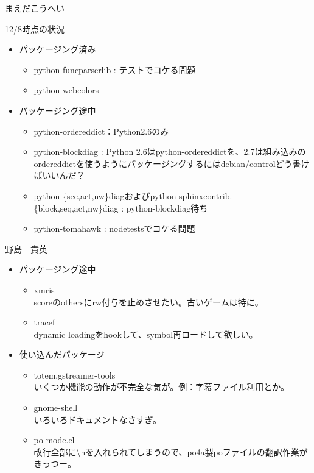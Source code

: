 \begin{prework}{ まえだこうへい }

12/8時点の状況

\begin{itemize}
\item パッケージング済み
\begin{itemize}
\item python-funcparserlib : テストでコケる問題
\item python-webcolors
\end{itemize}
\item パッケージング途中
\begin{itemize}
\item python-ordereddict：Python2.6のみ
\item python-blockdiag : Python 2.6はpython-ordereddictを、2.7は組み込みのordereddictを使うようにパッケージングするにはdebian/controlどう書けばいいんだ？
\item python-\{sec,act,nw\}diagおよびpython-sphinxcontrib.\{block,seq,act,nw\}diag : python-blockdiag待ち
\item python-tomahawk : nodetestsでコケる問題
\end{itemize}
\end{itemize}


\end{prework}

\begin{prework}{野島　貴英}
\begin{itemize}
\item パッケージング途中
\begin{itemize}
\item xmris\\
scoreのothersにrw付与を止めさせたい。古いゲームは特に。
\item tracef\\
dynamic loadingをhookして、symbol再ロードして欲しい。
\end{itemize}
\item 使い込んだパッケージ
\begin{itemize}
\item totem,gstreamer-tools\\
いくつか機能の動作が不完全な気が。例：字幕ファイル利用とか。
\item gnome-shell\\
いろいろドキュメントなさすぎ。
\item po-mode.el\\
改行全部に\textbackslash{}nを入れられてしまうので、po4a製poファイルの翻訳作業がきっつー。
\end{itemize}
\end{itemize}
\end{prework}
